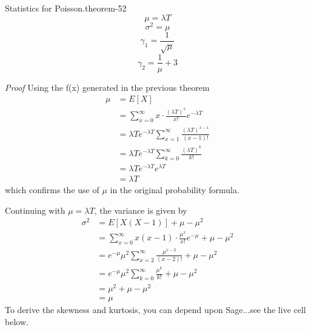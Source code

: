 \documentclass[10pt,]{book}
\makeatletter
\renewcommand*{\proofname}{Proof}
\renewenvironment{proof}[1][\proofname]{\par
  \pushQED{\qed}%
  \normalfont \topsep6\p@\@plus6\p@\relax
  \trivlist
  \item\relax
    {\itshape
    #1\@addpunct{.}}\hspace\labelsep\ignorespaces
}{%
  \popQED\endtrivlist\@endpefalse
}
\numberwithin{equation}{section}
\makeatother
\begin{document}
%
\par
\hypertarget{p-1060}{}%
\begin{theorem}{Statistics for Poisson.}{}{theorem-52}%
\hypertarget{p-1061}{}%
%
\begin{equation*}
\mu = \lambda T
\end{equation*}
%
\begin{equation*}
\sigma^2 = \mu
\end{equation*}
%
\begin{equation*}
\gamma_1 = \frac{1}{\sqrt{\mu}}
\end{equation*}
%
\begin{equation*}
\gamma_2 = \frac{1}{\mu}+3
\end{equation*}
%
\end{theorem}
\begin{proof}\hypertarget{proof-54}{}
\hypertarget{p-1062}{}%
Using the f(x) generated in the previous theorem%
\begin{align*}
\mu & = E[X] \\
& = \sum_{x=0}^{\infty} x \cdot \frac{(\lambda T)^x}{x!} e^{-\lambda T}\\
& = \lambda T e^{-\lambda T} \sum_{x=1}^{\infty} \frac{(\lambda T)^{x-1}}{(x-1)!} \\
& = \lambda T e^{-\lambda T} \sum_{k=0}^{\infty} \frac{(\lambda T)^k}{k!} \\
& = \lambda T e^{-\lambda T} e^{\lambda T} \\
& = \lambda T 
\end{align*}
which confirms the use of \(\mu\) in the original probability formula.%
\par
\hypertarget{p-1063}{}%
Continuing with \(\mu = \lambda T\), the variance is given by%
\begin{align*}
\sigma^2 & = E[X(X-1)] + \mu - \mu^2 \\
& = \sum_{x=0}^{\infty} x(x-1) \cdot \frac{\mu^x}{x!} e^{-\mu} + \mu - \mu^2\\
& = e^{-\mu} \mu^2 \sum_{x=2}^{\infty} \frac{\mu^{x-2}}{(x-2)!} + \mu - \mu^2\\
& = e^{-\mu} \mu^2 \sum_{k=0}^{\infty} \frac{\mu^k}{k!} + \mu - \mu^2\\
& = \mu^2 + \mu - \mu^2 \\
& = \mu
\end{align*}
To derive the skewness and kurtosis, you can depend upon Sage...see the live cell below.%
\end{proof}
%
\par
\hypertarget{p-1064}{}%
\end{document}
